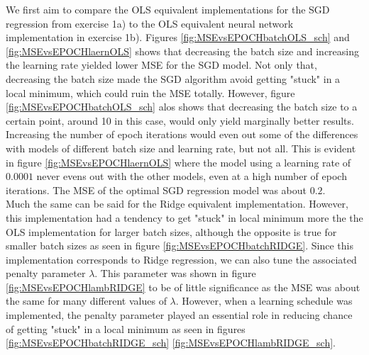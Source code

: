\documentclass[12pt,a4paper]{article}
\begin{document}
\noindent We first aim to compare the OLS equivalent implementations for the SGD regression from exercise 1a) to the OLS equivalent neural network implementation in exercise 1b). Figures \ref{fig:MSEvsEPOCHbatchOLS_sch} and \ref{fig:MSEvsEPOCHlaernOLS} shows that decreasing the batch size and increasing the learning rate yielded lower MSE for the SGD model. Not only that, decreasing the batch size made the SGD algorithm avoid getting "stuck" in a local minimum, which could ruin the MSE totally. However, figure \ref{fig:MSEvsEPOCHbatchOLS_sch} alos shows that decreasing the batch size to a certain point, around 10 in this case, would only yield marginally better results. Increasing the number of epoch iterations would even out some of the differences with models of different batch size and learning rate, but not all. This is evident in figure \ref{fig:MSEvsEPOCHlaernOLS} where the model using a learning rate of $0.0001$ never evens out with the other models, even at a high number of epoch iterations. The MSE of the optimal SGD regression model was about $0.2$.
\\
Much the same can be said for the Ridge equivalent implementation. However, this implementation had a tendency to get "stuck" in local minimum more the the OLS implementation for larger batch sizes, although the opposite is true for smaller batch sizes as seen in figure \ref{fig:MSEvsEPOCHbatchRIDGE}. Since this implementation corresponds to Ridge regression, we can also tune the associated penalty parameter $\lambda$. This parameter was shown in figure \ref{fig:MSEvsEPOCHlambRIDGE} to be of little significance as the MSE was about the same for many different values of $\lambda$. However, when a learning schedule was implemented, the penalty parameter played an essential role in reducing chance of getting "stuck" in a local minimum as seen in figures \ref{fig:MSEvsEPOCHbatchRIDGE_sch} \ref{fig:MSEvsEPOCHlambRIDGE_sch}. 
\\
\end{document}
